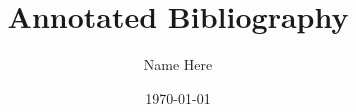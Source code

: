 \documentclass[12pt,a4paper]{article}
\title{Annotated Bibliography} %
\author{Name Here} %
\date{\today} %
\begin{document}
\maketitle

\hangindent=0.5in 

\begin{adjustwidth}{1in}{1in}
  \blindtext %
\end{adjustwidth}

\hangindent=0.5in 

\begin{adjustwidth}{1in}{1in}
  \blindtext %
\end{adjustwidth}

\end{document}
